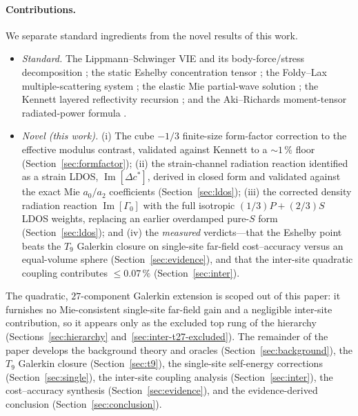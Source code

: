 \documentclass[11pt,a4paper]{article}
\newcommand{\D}{\Delta}
\theoremstyle{plain}
\theoremstyle{definition}
\theoremstyle{remark}
\begin{document}
\paragraph{Contributions.}
We separate standard ingredients from the novel results of this work.
\begin{itemize}[leftmargin=2em]
  \item \emph{Standard.}  The Lippmann--Schwinger VIE and its body-force/stress
    decomposition \cite{mura1987,hudson1980}; the static Eshelby concentration
    tensor \cite{eshelby1957}; the Foldy--Lax multiple-scattering system
    \cite{foldy1945,lax1951,waterman1969}; the elastic Mie partial-wave
    solution \cite{yingtruell1956}; the Kennett layered reflectivity recursion
    \cite{kennett1983}; and the Aki--Richards moment-tensor radiated-power
    formula \cite{akirichards2002}.
  \item \emph{Novel (this work).}  (i) The cube $-1/3$ finite-size form-factor
    correction to the effective modulus contrast, validated against Kennett to
    a ${\sim}1\,\%$ floor (Section~\ref{sec:formfactor}); (ii) the
    strain-channel radiation reaction identified as a strain LDOS,
    $\operatorname{Im}[\D c^*]$, derived in closed form and validated against the
    exact Mie $a_0/a_2$ coefficients (Section~\ref{sec:ldos}); (iii) the
    corrected density radiation reaction $\operatorname{Im}[\Gamma_0]$ with the
    full isotropic $(1/3)P + (2/3)S$ LDOS weights, replacing an earlier
    overdamped pure-$S$ form (Section~\ref{sec:ldos}); and (iv) the
    \emph{measured} verdicts---that the Eshelby point beats the $T_9$ Galerkin
    closure on single-site far-field cost--accuracy versus an equal-volume
    sphere (Section~\ref{sec:evidence}), and that the inter-site quadratic
    coupling contributes $\le 0.07\,\%$ (Section~\ref{sec:inter}).
\end{itemize}

The quadratic, $27$-component Galerkin extension is scoped out of this paper:
it furnishes no Mie-consistent single-site far-field gain and a negligible
inter-site contribution, so it appears only as the excluded top rung of the
hierarchy (Sections~\ref{sec:hierarchy} and~\ref{sec:inter-t27-excluded}).
The remainder of the paper develops the background theory and oracles
(Section~\ref{sec:background}), the $T_9$ Galerkin closure
(Section~\ref{sec:t9}), the single-site self-energy corrections
(Section~\ref{sec:single}), the inter-site coupling analysis
(Section~\ref{sec:inter}), the cost--accuracy synthesis
(Section~\ref{sec:evidence}), and the evidence-derived conclusion
(Section~\ref{sec:conclusion}).
\end{document}
